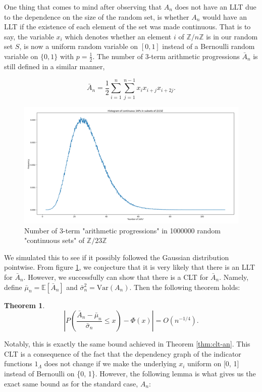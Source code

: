 \documentclass[12pt]{article} %
\newcommand{\p}[1]{\left(#1\right)}
\newcommand{\abs}[1]{\left\lvert#1\right\rvert}
\newcommand{\Var}{\mathrm{Var}}
\newcommand{\E}{\mathbb{E}}
\newcommand{\Z}{\mathbb{Z}}
\newtheorem{thm}{Theorem}[section]
\theoremstyle{definition}
\theoremstyle{definition}
\begin{document}
One thing that comes to mind after observing that $A_n$ does not have an LLT due to the dependence on the size of the random set, is whether $A_n$ would have an LLT if the existence of each element of the set was made continuous. That is to say, the variable $x_i$ which denotes whether an element $i$ of $\Z / n\Z$ is in our random set $S$, is now a uniform random variable on $[0, 1]$ instead of a Bernoulli random variable on $\{0, 1\}$ with $p=\frac{1}{2}$. The number of 3-term arithmetic progressions $\bar{A}_n$ is still defined in a similar manner,

$$ \bar{A}_n = \frac{1}{2}\sum_{i = 1}^{n} {\sum_{j = 1}^{n-1} {x_i x_{i+j} x_{i+2j}}}. $$

\begin{figure}[t]
	\centering
    \includegraphics[width=\textwidth]{3ap-cont}
    \caption{Number of 3-term "arithmetic progressions" in 1000000 random "continuous sets" of $\Z / 23\Z$} %
    \label{fig:3ap-cont}
\end{figure}

We simulated this to see if it possibly followed the Gaussian distribution pointwise. From figure \ref{fig:3ap-cont}, we conjecture that it is very likely that there is an LLT for $\bar{A}_n$. However, we successfully can show that there is a CLT for $\bar{A}_n$. Namely, define $\bar{\mu}_n = \E[\bar{A}_n]$ and $\bar{\sigma}_n^2 = \Var(A_n)$. Then the following theorem holds:

\begin{thm}
\label{thm:clt-an-cont}
$$\abs{P\p{\frac{\bar{A}_n - \bar{\mu}_n}{\bar{\sigma}_n} \leq x} - \Phi(x)} = O\p{n^{-1/4}}.$$
\end{thm}

Notably, this is exactly the same bound achieved in Theorem \ref{thm:clt-an}. This CLT is a consequence of the fact that the dependency graph of the indicator functions $1_\Lambda$ does not change if we make the underlying $x_i$ uniform on [0, 1] instead of Bernoulli on \{0, 1\}. However, the following lemma is what gives us the exact same bound as for the standard case, $A_n$:
\end{document}
